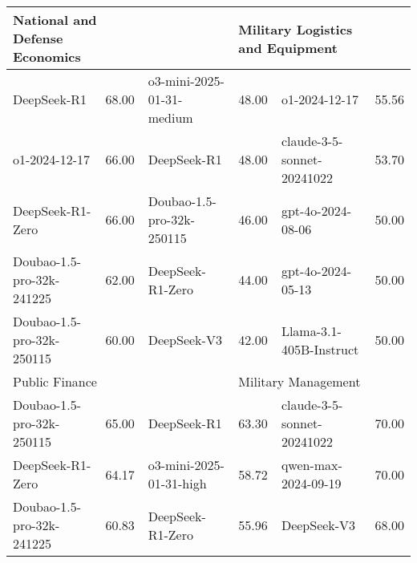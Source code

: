 {\begin{longtable}{p{4.2cm}>{\centering\arraybackslash} p{0.8cm}|p{4.2cm} >{\centering\arraybackslash} p{0.8cm}|p{4.2cm} >{\centering\arraybackslash} p{0.8cm}}
\hline
\multicolumn{2}{p{5.15cm}|}{\cellcolor{pink!10} \centering National and Defense Economics} & \multicolumn{2}{p{5.15cm}|}{\cellcolor{blue!10} \centering Refrigeration and Cryogenic Engineering} & \multicolumn{2}{p{5.15cm}}{\cellcolor{magenta!10} \centering Military Logistics and Equipment}\\
\hline
\cellcolor{pink!5} DeepSeek-R1 & \cellcolor{pink!2}68.00 & \cellcolor{blue!5} o3-mini-2025-01-31-medium & \cellcolor{blue!2} 48.00 & \cellcolor{magenta!5} o1-2024-12-17 & \cellcolor{magenta!2} 55.56\\
\cellcolor{pink!5} o1-2024-12-17 & \cellcolor{pink!2}66.00 & \cellcolor{blue!5} DeepSeek-R1 & \cellcolor{blue!2} 48.00 & \cellcolor{magenta!5} claude-3-5-sonnet-20241022 & \cellcolor{magenta!2} 53.70\\
\cellcolor{pink!5} DeepSeek-R1-Zero & \cellcolor{pink!2}66.00 & \cellcolor{blue!5} Doubao-1.5-pro-32k-250115 & \cellcolor{blue!2} 46.00 & \cellcolor{magenta!5} gpt-4o-2024-08-06 & \cellcolor{magenta!2} 50.00\\
\cellcolor{pink!5} Doubao-1.5-pro-32k-241225 & \cellcolor{pink!2}62.00 & \cellcolor{blue!5} DeepSeek-R1-Zero & \cellcolor{blue!2} 44.00 & \cellcolor{magenta!5} gpt-4o-2024-05-13 & \cellcolor{magenta!2} 50.00\\
\cellcolor{pink!5} Doubao-1.5-pro-32k-250115 & \cellcolor{pink!2}60.00 & \cellcolor{blue!5} DeepSeek-V3 & \cellcolor{blue!2} 42.00 & \cellcolor{magenta!5} Llama-3.1-405B-Instruct & \cellcolor{magenta!2} 50.00\\
\hline
\multicolumn{2}{p{5.15cm}|}{\cellcolor{pink!10} \centering Public Finance} & \multicolumn{2}{p{5.15cm}|}{\cellcolor{blue!10} \centering Thermal Energy Engineering} & \multicolumn{2}{p{5.15cm}}{\cellcolor{magenta!10} \centering Military Management}\\
\hline
\cellcolor{pink!5} Doubao-1.5-pro-32k-250115 & \cellcolor{pink!2}65.00 & \cellcolor{blue!5} DeepSeek-R1 & \cellcolor{blue!2} 63.30 & \cellcolor{magenta!5} claude-3-5-sonnet-20241022 & \cellcolor{magenta!2} 70.00\\
\cellcolor{pink!5} DeepSeek-R1-Zero & \cellcolor{pink!2}64.17 & \cellcolor{blue!5} o3-mini-2025-01-31-high & \cellcolor{blue!2} 58.72 & \cellcolor{magenta!5} qwen-max-2024-09-19 & \cellcolor{magenta!2} 70.00\\
\cellcolor{pink!5} Doubao-1.5-pro-32k-241225 & \cellcolor{pink!2}60.83 & \cellcolor{blue!5} DeepSeek-R1-Zero & \cellcolor{blue!2} 55.96 & \cellcolor{magenta!5} DeepSeek-V3 & \cellcolor{magenta!2} 68.00\\

\end{longtable}}
